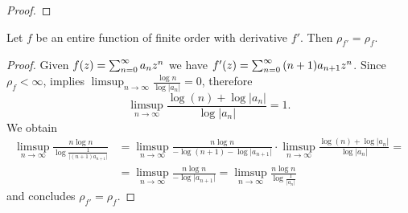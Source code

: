 \begin{proof}
\end{proof}

\begin{example} \label{exm:examples-orders}
\end{example}



\begin{proposition} \label{prop:order-derivative}
    Let $f$ be an entire function of finite order with derivative $f'$. Then $\rho_{f'} = \rho_f$.
\end{proposition}

\begin{proof}
    Given $f(z) = \sum_{n=0}^\infty {a_n}z^{n}$ we have $f'(z) = \sum_{n=0}^\infty {(n+1)a_{n+1}}z^{n}$. Since $\rho_f < \infty$,  implies $ \limsup_{n \to \infty} \frac{\log n}{\log \vert a_{n} \vert} = 0 $, therefore
    $$ \limsup_{n \to \infty} \frac{\log (n) + \log\vert a_n \vert}{\log \vert a_n \vert} = 1. $$
    We obtain
    \begin{align*}
        \limsup_{n \to \infty} \frac{n \log n}{\log \frac{1}{\vert (n+1) a_{n+1} \vert}} &= \limsup_{n \to \infty} \frac{n \log n}{-\log (n+1) - \log \vert a_{n+1} \vert} \cdot \limsup_{n \to \infty} \frac{\log (n) + \log\vert a_n \vert}{\log \vert a_n \vert} = \\
        &= \limsup_{n \to \infty} \frac{n \log n}{- \log \vert a_{n+1} \vert} = \limsup_{n \to \infty} \frac{n \log n}{\log \frac{1}{\vert a_{n} \vert}}
    \end{align*}
    and  concludes $\rho_{f'} = \rho_f$.
\end{proof}